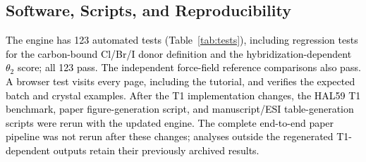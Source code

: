 \documentclass[journal=jcisd8,manuscript=suppinfo]{achemso}
\newcommand{\tcb}[1]{{\textcolor{black}{#1}}}
\newcommand{\BX}{BondX Studio}
\begin{document}
\begin{singlespace}
\section{Software, Scripts, and Reproducibility}
\label{sec:tests}

\tcb{The engine has 123 automated tests (Table~\ref{tab:tests}), including regression tests for the carbon-bound Cl/Br/I donor definition and the hybridization-dependent $\theta_2$ score; all 123 pass. The independent force-field reference comparisons also pass. A browser test visits every page, including the tutorial, and verifies the expected batch and crystal examples. After the T1 implementation changes, the HAL59 T1 benchmark, paper figure-generation script, and manuscript/ESI table-generation scripts were rerun with the updated engine. The complete end-to-end paper pipeline was not rerun after these changes; analyses outside the regenerated T1-dependent outputs retain their previously archived results.}



\end{singlespace}
\end{document}
